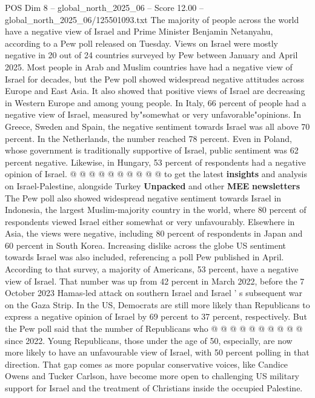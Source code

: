\begin{textsample}{POS Dim 8 – global\_north\_2025\_06 – Score 12.00 – global\_north\_2025\_06/125501093.txt}  \label{ex:f8_pos_046}
The majority of people across the world have a negative view of Israel and Prime Minister Benjamin Netanyahu, according to a Pew poll released on Tuesday.
Views on Israel were mostly negative in 20 out of 24 countries surveyed by Pew between January and April 2025.
Most people in Arab and Muslim countries have had a negative view of Israel for decades, but the Pew poll showed widespread negative attitudes across Europe and East Asia.
It also showed that positive views of Israel are decreasing in Western Europe and among young people.
In Italy, 66 percent of people had a negative view of Israel, measured by"somewhat or very unfavorable"opinions.
In Greece, Sweden and Spain, the negative sentiment towards Israel was all above 70 percent.
In the Netherlands, the number reached 78 percent.
Even in Poland, whose government is traditionally supportive of Israel, public sentiment was 62 percent negative.
Likewise, in Hungary, 53 percent of respondents had a negative opinion of Israel. @ @ @ @ @ @ @ @ @ @ to get the latest \textbf{insights} and analysis on Israel-Palestine, alongside Turkey \textbf{Unpacked} and other \textbf{MEE} \textbf{newsletters} The Pew poll also showed widespread negative sentiment towards Israel in Indonesia, the largest Muslim-majority country in the world, where 80 percent of respondents viewed Israel either somewhat or very unfavourably.
Elsewhere in Asia, the views were negative, including 80 percent of respondents in Japan and 60 percent in South Korea.
Increasing dislike across the globe US sentiment towards Israel was also included, referencing a poll Pew published in April.
According to that survey, a majority of Americans, 53 percent, have a negative view of Israel.
That number was up from 42 percent in March 2022, before the 7 October 2023 Hamas-led attack on southern Israel and Israel ' s subsequent war on the Gaza Strip.
In the US, Democrats are still more likely than Republicans to express a negative opinion of Israel by 69 percent to 37 percent, respectively.
But the Pew poll said that the number of Republicans who @ @ @ @ @ @ @ @ @ @ since 2022.
Young Republicans, those under the age of 50, especially, are now more likely to have an unfavourable view of Israel, with 50 percent polling in that direction.
That gap comes as more popular conservative voices, like Candice Owens and Tucker Carlson, have become more open to challenging US military support for Israel and the treatment of Christians inside the occupied Palestine.

\end{textsample}

